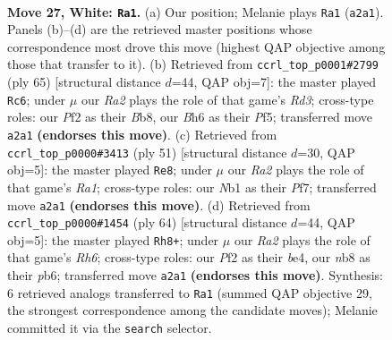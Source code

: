 \documentclass[11pt]{article}
\begin{document}
\clearpage

\begin{figure}[p]\centering
\begin{subfigure}{0.46\textwidth}\centering
\resizebox{\linewidth}{!}{%
\newchessgame
\chessboard[
  setfen={rn6/5k2/5b1B/2p1p3/p6p/P7/RPP2PPP/1N2K3 w - - 0 27},
  showmover=false,
  pgfstyle=straightmove, color=movearrow, markmove={a2-a1}
]}
\caption{}
\end{subfigure}\hfill
\begin{subfigure}{0.46\textwidth}\centering
\resizebox{\linewidth}{!}{%
\newchessgame
\chessboard[
  setfen={1bk5/5p1p/3rp3/3p1pPP/P4P2/2P1BK2/8/2R5 b - - 2 33},
  showmover=false,
  pgfstyle=straightmove, color=movearrow, markmove={d6-c6}
]}
\caption{}
\end{subfigure}
\\[4pt]
\begin{subfigure}{0.46\textwidth}\centering
\resizebox{\linewidth}{!}{%
\newchessgame
\chessboard[
  setfen={r5k1/5pp1/2RB3p/3p4/p2P2PP/P2b1P2/5K2/8 b - - 1 26},
  showmover=false,
  pgfstyle=straightmove, color=movearrow, markmove={a8-e8}
]}
\caption{}
\end{subfigure}\hfill
\begin{subfigure}{0.46\textwidth}\centering
\resizebox{\linewidth}{!}{%
\newchessgame
\chessboard[
  setfen={6k1/1p1r4/1p5R/4Bpp1/p3b3/P3P1PP/1P6/6K1 w - - 0 33},
  showmover=false,
  pgfstyle=straightmove, color=movearrow, markmove={h6-h8}
]}
\caption{}
\end{subfigure}
\caption{\textbf{Move 27, White: \texttt{Ra1}.} (a) Our position; Melanie plays \texttt{Ra1} (\texttt{a2a1}). Panels (b)--(d) are the retrieved master positions whose correspondence most drove this move (highest QAP objective among those that transfer to it). (b) Retrieved from \texttt{ccrl\_top\_p0001\#2799} (ply 65) [structural distance $d$=44, QAP obj=7]: the master played \texttt{Rc6}; under $\mu$ our \emph{Ra2} plays the role of that game's \emph{Rd3}; cross-type roles: our \emph{P}f2 as their \emph{B}b8, our \emph{B}h6 as their \emph{P}f5; transferred move \texttt{a2a1} \textbf{(endorses this move)}. (c) Retrieved from \texttt{ccrl\_top\_p0000\#3413} (ply 51) [structural distance $d$=30, QAP obj=5]: the master played \texttt{Re8}; under $\mu$ our \emph{Ra2} plays the role of that game's \emph{Ra1}; cross-type roles: our \emph{N}b1 as their \emph{P}f7; transferred move \texttt{a2a1} \textbf{(endorses this move)}. (d) Retrieved from \texttt{ccrl\_top\_p0000\#1454} (ply 64) [structural distance $d$=44, QAP obj=5]: the master played \texttt{Rh8+}; under $\mu$ our \emph{Ra2} plays the role of that game's \emph{Rh6}; cross-type roles: our \emph{P}f2 as their \emph{b}e4, our \emph{n}b8 as their \emph{p}b6; transferred move \texttt{a2a1} \textbf{(endorses this move)}. Synthesis: 6 retrieved analogs transferred to \texttt{Ra1} (summed QAP objective 29, the strongest correspondence among the candidate moves); Melanie committed it via the \texttt{search} selector.}
\label{fig:thought-m52}
\end{figure}
\end{document}
